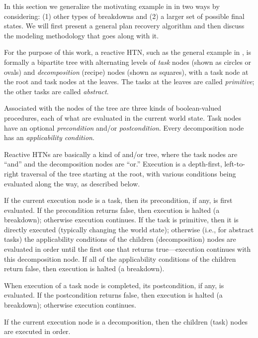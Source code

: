 \documentclass{llncs}
\begin{document}

\noindent In this section we generalize the motivating example in
 in two ways by considering: (1) other types of
breakdowns and (2) a larger set of possible final states.  We will
first present a general plan recovery algorithm and then discuss the
modeling methodology that goes along with it.


\noindent For the purpose of this work, a reactive HTN, such as the
general example in , is formally a bipartite tree
with alternating levels of {\em task} nodes (shown as circles or
ovals) and {\em decomposition} (recipe) nodes (shown as squares), with
a task node at the root and task nodes at the leaves.  The tasks at
the leaves are called {\em primitive}; the other tasks are called {\em
  abstract}.

Associated with the nodes of the tree are three kinds of
boolean-valued procedures, each of what are evaluated in the current
world state.  Task nodes have an optional {\em precondition} and/or
{\em postcondition}.  Every decomposition node has an {\em
  applicability condition}.

Reactive HTNs are basically a kind of and/or tree, where the task
nodes are ``and'' and the decomposition nodes are ``or.''  Execution
is a depth-first, left-to-right traversal of the tree starting at the
root, with various conditions being evaluated along the way, as
described below.

If the current execution node is a task, then its precondition, if
any, is first evaluated.  If the precondition returns false, then
execution is halted (a breakdown); otherwise execution continues.  If
the task is primitive, then it is directly executed (typically
changing the world state); otherwise (i.e., for abstract tasks) the
applicability conditions of the children (decomposition) nodes are
evaluated in order until the first one that returns true---execution
continues with this decomposition node.  If all of the applicability
conditions of the children return false, then execution is halted (a
breakdown).

When execution of a task node is completed, its postcondition, if any,
is evaluated.  If the postcondition returns false, then execution is
halted (a breakdown); otherwise execution continues.

If the current execution node is a decomposition, then the children
(task) nodes are executed in order.
\end{document}
